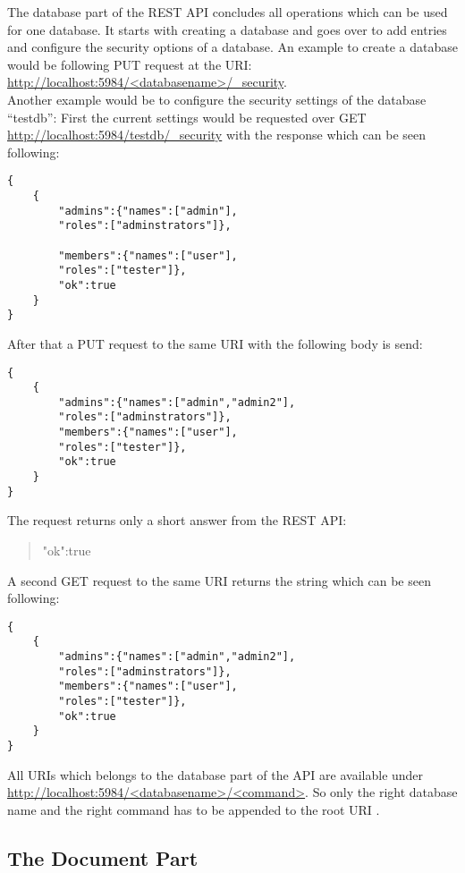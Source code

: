 The database part of the REST API concludes all operations which can be used for one database. It starts with creating a database and goes over to add entries and configure the security options of a database.
An example to create a database would be following PUT request at the URI:
\url{http://localhost:5984/<databasename>/_security}. \\
Another example would be to configure the security settings of the database “testdb”:
First the current settings would be requested over GET  \url{http://localhost:5984/testdb/_security} with the response which can be seen following: 
\begin{lstlisting}[frame=single, caption= Example security response]
{
    {
        "admins":{"names":["admin"],
        "roles":["adminstrators"]},
        
        "members":{"names":["user"],
        "roles":["tester"]},
        "ok":true
    }
}
\end{lstlisting} 
\newpage 
After that a PUT request to the same URI with the following body is send:
\begin{lstlisting}[frame=single, caption= Put request body]
{
    {
        "admins":{"names":["admin","admin2"],
        "roles":["adminstrators"]},
        "members":{"names":["user"],
        "roles":["tester"]},
        "ok":true
    } 
}
\end{lstlisting} 
The request returns only a short answer from the REST API: 
\begin{quote}{"ok":true} \end{quote}
A second GET request to the same URI returns the string which can be seen following:
\begin{lstlisting}[frame=single, caption=  Get response]
{
    {
        "admins":{"names":["admin","admin2"],
        "roles":["adminstrators"]},
        "members":{"names":["user"],
        "roles":["tester"]},
        "ok":true
    }
}

\end{lstlisting}
All URIs which belongs to the database part of the API are available under  \url{http://localhost:5984/<databasename>/<command>}. So only the right database name and the right command has to be appended to the root URI \cite{CouchDBRestDatabases}.

\subsection{The Document Part}

